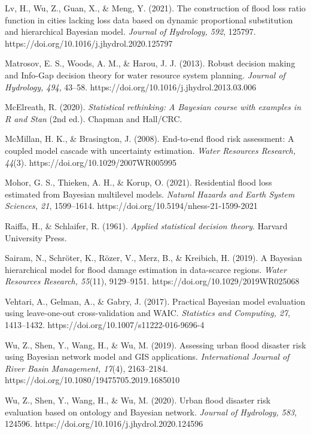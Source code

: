 \documentclass[
]{article}
\begin{document}
Lv, H., Wu, Z., Guan, X., \& Meng, Y. (2021). The construction of flood
loss ratio function in cities lacking loss data based on dynamic
proportional substitution and hierarchical Bayesian model. \emph{Journal
of Hydrology, 592}, 125797.
https://doi.org/10.1016/j.jhydrol.2020.125797

Matrosov, E. S., Woods, A. M., \& Harou, J. J. (2013). Robust decision
making and Info-Gap decision theory for water resource system planning.
\emph{Journal of Hydrology, 494}, 43--58.
https://doi.org/10.1016/j.jhydrol.2013.03.006

McElreath, R. (2020). \emph{Statistical rethinking: A Bayesian course
with examples in R and Stan} (2nd ed.). Chapman and Hall/CRC.

McMillan, H. K., \& Brasington, J. (2008). End-to-end flood risk
assessment: A coupled model cascade with uncertainty estimation.
\emph{Water Resources Research, 44}(3).
https://doi.org/10.1029/2007WR005995

Mohor, G. S., Thieken, A. H., \& Korup, O. (2021). Residential flood
loss estimated from Bayesian multilevel models. \emph{Natural Hazards
and Earth System Sciences, 21}, 1599--1614.
https://doi.org/10.5194/nhess-21-1599-2021

Raiffa, H., \& Schlaifer, R. (1961). \emph{Applied statistical decision
theory}. Harvard University Press.

Sairam, N., Schröter, K., Rözer, V., Merz, B., \& Kreibich, H. (2019). A
Bayesian hierarchical model for flood damage estimation in data-scarce
regions. \emph{Water Resources Research, 55}(11), 9129--9151.
https://doi.org/10.1029/2019WR025068

Vehtari, A., Gelman, A., \& Gabry, J. (2017). Practical Bayesian model
evaluation using leave-one-out cross-validation and WAIC.
\emph{Statistics and Computing, 27}, 1413--1432.
https://doi.org/10.1007/s11222-016-9696-4

Wu, Z., Shen, Y., Wang, H., \& Wu, M. (2019). Assessing urban flood
disaster risk using Bayesian network model and GIS applications.
\emph{International Journal of River Basin Management, 17}(4),
2163--2184. https://doi.org/10.1080/19475705.2019.1685010

Wu, Z., Shen, Y., Wang, H., \& Wu, M. (2020). Urban flood disaster risk
evaluation based on ontology and Bayesian network. \emph{Journal of
Hydrology, 583}, 124596. https://doi.org/10.1016/j.jhydrol.2020.124596
\end{document}
